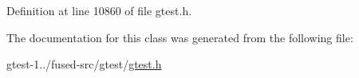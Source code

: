 \-Definition at line 10860 of file gtest.\-h.



\-The documentation for this class was generated from the following file\-:\begin{DoxyCompactItemize}
\item 
gtest-\/1../fused-\/src/gtest/\hyperlink{fused-src_2gtest_2gtest_8h}{gtest.\-h}\end{DoxyCompactItemize}
